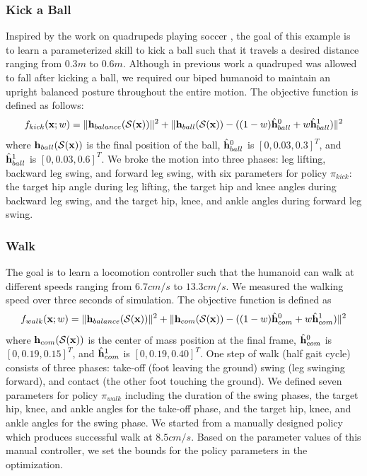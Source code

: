 \subsubsection{Kick a Ball}
Inspired by the work on quadrupeds playing soccer
\cite{Hausknecht:2010:LPK}, the goal of this example is to learn a parameterized skill to kick a ball such that it travels a desired distance ranging from
$0.3m$ to $0.6m$.
Although in previous work a quadruped was allowed to fall
after kicking a ball, we required our biped humanoid to maintain an
upright balanced posture throughout the entire motion.
The objective function is defined as follows:
\begin{equation}
  f_{kick}(\mathbf{x}; w) =
  \|\mathbf{h}_{balance}(\mathcal{S}(\mathbf{x}))\|^2 + 
  \| \mathbf{h}_{ball} (\mathcal{S}(\mathbf{x})) -  
  ((1-w)\hat{\mathbf{h}}_{ball}^{0} + w\hat{\mathbf{h}}_{ball}^{1}) \|^2
\end{equation} 
  where $\mathbf{h}_{ball}(\mathcal{S}(\mathbf{x}))$ is the final position of the ball, $\hat{\mathbf{h}}_{ball}^{0}$ is $[0, 0.03, 0.3]^T$, and
  $\hat{\mathbf{h}}_{ball}^{1}$ is $[0, 0.03, 0.6]^T$.
We broke the motion into three phases: leg
lifting, backward leg swing, and forward leg swing, with six
parameters for policy $\pi_{kick}$:
the target hip angle during leg lifting, the target hip and knee
angles during backward leg swing, and the target hip, knee, and ankle angles during forward leg swing.

\subsubsection{Walk}
The goal is to learn a locomotion controller such that the humanoid
can walk at different speeds ranging from $6.7cm/s$ to
$13.3cm/s$. We measured the walking speed over three seconds of
simulation. The objective function is defined as
\begin{equation}
  f_{walk}(\mathbf{x}; w) =
  \|\mathbf{h}_{balance}(\mathcal{S}(\mathbf{x}))\|^2 + 
  \| \mathbf{h}_{com} (\mathcal{S}(\mathbf{x})) -  
  ((1-w)\hat{\mathbf{h}}_{com}^{0} + w\hat{\mathbf{h}}_{com}^{1}) \|^2
\end{equation} 
where $\mathbf{h}_{com}(\mathcal{S}(\mathbf{x}))$ is the center of mass
position at the final frame, $\hat{\mathbf{h}}_{com}^{0}$ is $[0, 0.19, 0.15]^T$, and
$\hat{\mathbf{h}}_{com}^{1}$ is $[0, 0.19, 0.40]^T$. One step of walk (half gait cycle)
consists of three phases: take-off (foot leaving the ground)
swing (leg swinging forward), and contact (the other foot touching
the ground).  We defined seven parameters for policy $\pi_{walk}$
including the duration of the swing phases, the target hip, knee,
and ankle angles for the take-off phase, and the target hip, knee,
and ankle angles for the swing phase. We started from a manually
designed policy which produces successful walk at $8.5cm/s$. Based
on the parameter values of this manual controller, we set the bounds for
the policy parameters in the optimization.


